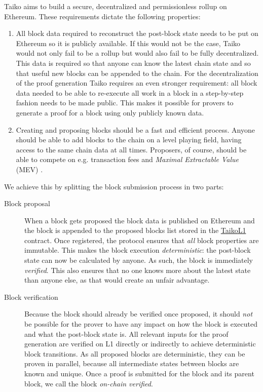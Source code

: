 \documentclass[9pt,oneside]{amsart}
\begin{document}
\begin{multicols}{2}
Taiko aims to build a secure, decentralized and permissionless rollup on Ethereum. These requirements dictate the following properties:
\begin{enumerate}
\item All block data required to reconstruct the post-block state needs to be put on Ethereum so it is publicly available. If this would not be the case, Taiko would not only fail to be a rollup but would also fail to be fully decentralized. This data is required so that anyone can know the latest chain state and so that useful new blocks can be appended to the chain. For the decentralization of the proof generation Taiko requires an even stronger requirement: all block data needed to be able to re-execute all work in a block in a step-by-step fashion needs to be made public. This makes it possible for provers to generate a proof for a block using only publicly known data.
\item Creating and proposing blocks should be a fast and efficient process. Anyone should be able to add blocks to the chain on a level playing field, having access to the same chain data at all times. Proposers, of course, should be able to compete on e.g. transaction fees and \emph{Maximal Extractable Value} (MEV) \cite{mev}.
\end{enumerate}

We achieve this by splitting the block submission process in two parts:
\begin{description}
\item[Block proposal] When a block gets proposed the block data is published on Ethereum and the block is appended to the proposed blocks list stored in the \underline{TaikoL1} contract. Once registered, the protocol ensures that \emph{all} block properties are immutable. This makes the block execution \emph{deterministic}: the post-block state can now be calculated by anyone. As such, the block is immediately \emph{verified}. This also ensures that no one knows more about the latest state than anyone else, as that would create an unfair advantage.
\item[Block verification] Because the block should already be verified once proposed, it should \emph{not} be possible for the prover to have any impact on how the block is executed and what the post-block state is. All relevant inputs for the proof generation are verified on L1 directly or indirectly to achieve deterministic block transitions. As all proposed blocks are deterministic, they can be proven in parallel, because all intermediate states between blocks are known and unique. Once a proof is submitted for the block and its parent block, we call the block \emph{on-chain verified}.
\end{description}


\end{multicols}
\end{document}
